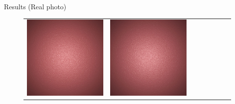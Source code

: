 \documentclass[final]{beamer}
\newlength{\twocolwid}
\newlength{\resultwidth}
\begin{document}
\begin{frame}[t]
\begin{columns}[t]
\begin{column}{\twocolwid}
\begin{block}{Results (Real photo)}
\begin{figure}[t]
\begin{tabular}{ccrclccc}
            		\includegraphics[width=\resultwidth]{real/bump/good2.jpg} &
            		\includegraphics[width=\resultwidth]{real/bump/good3.jpg} &

\end{tabular}
\end{figure}
\end{block}
\end{column}
\end{columns}
\end{frame}
\end{document}
